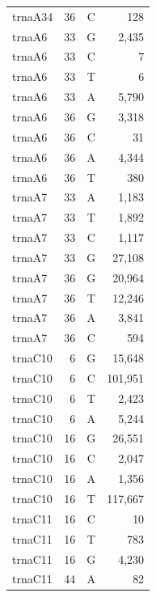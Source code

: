\documentclass[12pt]{rockefeller}
\begin{document}
{\begin{center}
\begin{supertabular}{|l|r|c|r|}
 trnaA34 &        36 &          C &        128 \\
  trnaA6 &        33 &          G &      2,435 \\
  trnaA6 &        33 &          C &          7 \\
  trnaA6 &        33 &          T &          6 \\
  trnaA6 &        33 &          A &      5,790 \\
  trnaA6 &        36 &          G &      3,318 \\
  trnaA6 &        36 &          C &         31 \\
  trnaA6 &        36 &          A &      4,344 \\
  trnaA6 &        36 &          T &        380 \\
  trnaA7 &        33 &          A &      1,183 \\
  trnaA7 &        33 &          T &      1,892 \\
  trnaA7 &        33 &          C &      1,117 \\
  trnaA7 &        33 &          G &     27,108 \\
  trnaA7 &        36 &          G &     20,964 \\
  trnaA7 &        36 &          T &     12,246 \\
  trnaA7 &        36 &          A &      3,841 \\
  trnaA7 &        36 &          C &        594 \\
 trnaC10 &         6 &          G &     15,648 \\
 trnaC10 &         6 &          C &    101,951 \\
 trnaC10 &         6 &          T &      2,423 \\
 trnaC10 &         6 &          A &      5,244 \\
 trnaC10 &        16 &          G &     26,551 \\
 trnaC10 &        16 &          C &      2,047 \\
 trnaC10 &        16 &          A &      1,356 \\
 trnaC10 &        16 &          T &    117,667 \\
 trnaC11 &        16 &          C &         10 \\
 trnaC11 &        16 &          T &        783 \\
 trnaC11 &        16 &          G &      4,230 \\
 trnaC11 &        44 &          A &         82 \\

\end{supertabular}
\end{center}}
\end{document}
